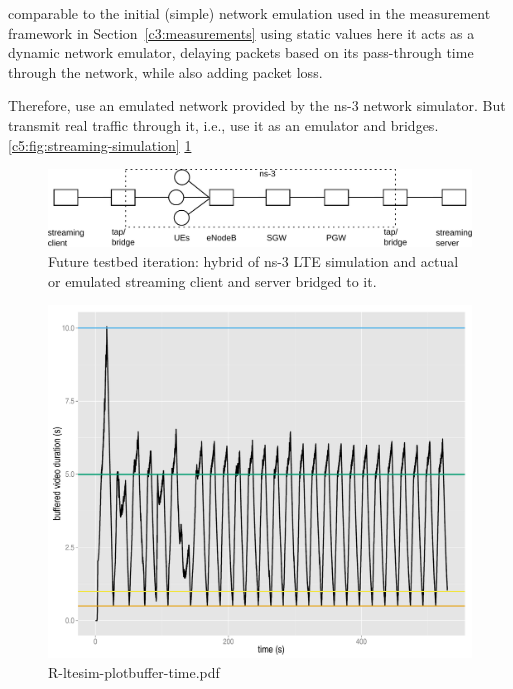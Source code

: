 comparable to the initial (simple) network emulation used in the measurement framework in Section~\ref{c3:measurements} using static values
here it acts as a dynamic network emulator, delaying packets based on its pass-through time through the network, while also adding packet loss.

Therefore, use an emulated network provided by the ns-3 network simulator. But transmit real traffic through it, i.e., use it as an emulator and bridges. \ref{c5:fig:streaming-simulation} \ref{c5:fig:streaming-hybrid}


\begin{figure}[htb]
\centering
\includegraphics[width=\textwidth]{images/streaming-hybrid.pdf}
\caption{Future testbed iteration: hybrid of ns-3 LTE simulation and actual or emulated streaming client and server bridged to it.}
\label{c5:fig:streaming-hybrid}
\end{figure}



\begin{figure}[htb]
\centering
\includegraphics[width=1.0\textwidth]{images/R-ltesim-plotbuffer-time.pdf}
\caption{R-ltesim-plotbuffer-time.pdf}
\label{c5:fig:ltesim-plotbuffer-time}
\end{figure}


